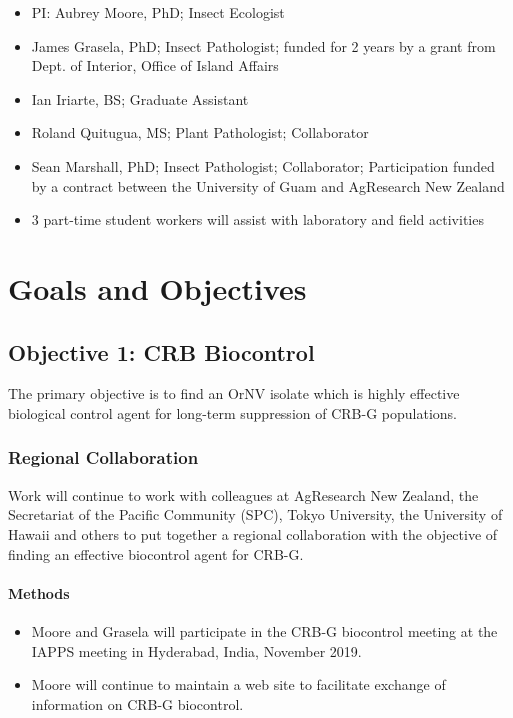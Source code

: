 \documentclass[14pt,english,letterpaper]{scrartcl}
\begin{document}
\begin{itemize}
\item PI: Aubrey Moore, PhD; Insect Ecologist
\item James Grasela, PhD; Insect Pathologist; funded for 2 years by a grant from Dept. of
Interior, Office of Island Affairs
\item Ian Iriarte, BS; Graduate Assistant
\item Roland Quitugua, MS; Plant Pathologist; Collaborator
\item Sean Marshall, PhD; Insect Pathologist; Collaborator; Participation funded by a contract
between the University of Guam and AgResearch New Zealand
\item 3 part-time student workers will assist with laboratory and field activities
\end{itemize}

\pagebreak

\section{Goals and Objectives} \label{goals}


\subsection{Objective 1: CRB Biocontrol}

The primary objective is to find an OrNV isolate which is highly effective biological control agent for long-term suppression of CRB-G populations.

\subsubsection{Regional Collaboration}

Work will continue to work with colleagues at AgResearch New Zealand, the Secretariat of the Pacific Community (SPC), Tokyo University, the University of Hawaii and others to put together a regional collaboration with the objective of finding an effective biocontrol agent for CRB-G. 

\paragraph{Methods}
\begin{itemize}
\item Moore and Grasela will participate in the CRB-G biocontrol meeting at the IAPPS meeting in Hyderabad, India, November 2019.
\item Moore will continue to maintain a web site to facilitate exchange of information on CRB-G biocontrol.
\end{itemize}
\end{document}
